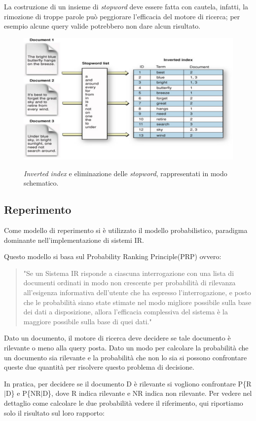 \documentclass[runningheads]{llncs}
\begin{document}
La costruzione di un insieme di \emph{stopword} deve essere fatta con cautela, infatti, la rimozione di troppe parole pu\`o peggiorare l'efficacia del motore di ricerca;
per esempio alcune query valide potrebbero non dare alcun risultato.

\begin{figure}%
    \centering
    {{\includegraphics[width=0.8\linewidth]{inverted_index} }}%
    \caption{\emph{Inverted index} e eliminazione delle \emph{stopword}, rappresentati in modo schematico.}%
\end{figure}

\subsection{Reperimento}
Come modello di reperimento si \`e utilizzato il modello probabilistico, paradigma dominante nell'implementazione di sistemi IR.

Questo modello si basa sul Probability Ranking Principle(PRP)\cite{PRP} ovvero:

\blockquote{"Se un Sistema IR risponde a ciascuna interrogazione con una lista di documenti ordinati in
modo non crescente per probabilit\`a di rilevanza all'esigenza informativa dell'utente che ha espresso l'interrogazione,
e posto che le probabilit\`a siano state stimate nel modo migliore possibile sulla base dei dati a disposizione, allora
l'efficacia complessiva del sistema \`e la maggiore possibile sulla base di quei dati."}

Dato un documento, il motore di ricerca deve decidere se tale documento \`e rilevante o meno alla query posta.
Dato un modo per calcolare la probabilit\`a che un documento sia rilevante e la probabilit\`a che non lo sia 
si possono confrontare queste due quantit\`a per risolvere questo problema di decisione.

In pratica, per decidere se il documento D \`e rilevante si vogliono confrontare P\{R$|$D\} e P\{NR$|$D\}, dove R indica rilevante e NR indica non rilevante.
Per vedere nel dettaglio come calcolare le due probabilit\`a vedere il riferimento, qui riportiamo solo il risultato sul loro rapporto:
\end{document}
